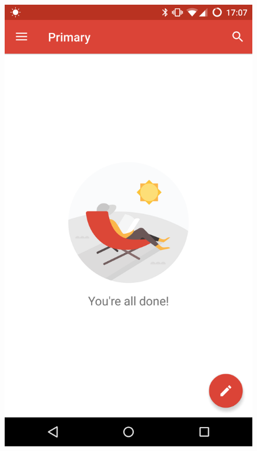 \begin{figure}[H]
	\centering
	{{\includegraphics[scale=0.1]{figures/findings/fab-Gmail.png} }}%
	\qquad

\end{figure}
